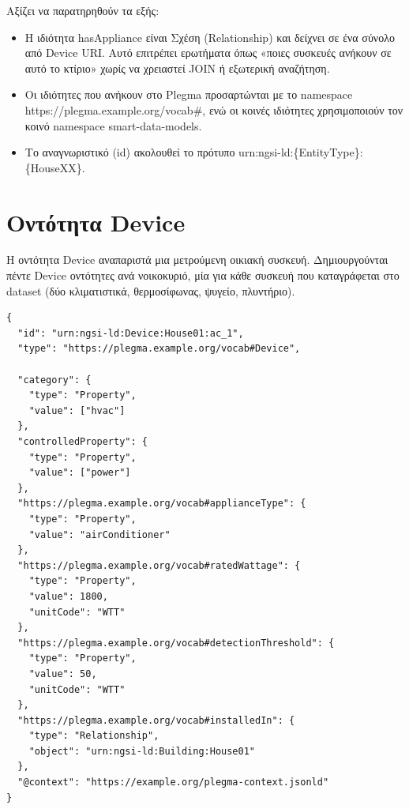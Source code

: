 Αξίζει να παρατηρηθούν τα εξής:
\begin{itemize}
    \item Η ιδιότητα \textlatin{hasAppliance} είναι Σχέση
    (\textlatin{Relationship}) και δείχνει σε ένα σύνολο από
    \textlatin{Device URI}. Αυτό επιτρέπει ερωτήματα όπως «ποιες συσκευές
    ανήκουν σε αυτό το κτίριο» χωρίς να χρειαστεί \textlatin{JOIN} ή
    εξωτερική αναζήτηση.
    \item Οι ιδιότητες που ανήκουν στο \textlatin{Plegma} προσαρτώνται με
    το \textlatin{namespace} \textlatin{https://plegma.example.org/vocab\#},
    ενώ οι κοινές ιδιότητες χρησιμοποιούν τον
    κοινό \textlatin{namespace} \textlatin{smart-data-models}.
    \item Το αναγνωριστικό (\textlatin{id}) ακολουθεί το πρότυπο
    \textlatin{urn:ngsi-ld:\{EntityType\}:\{HouseXX\}}.
\end{itemize}

\section{Οντότητα \textlatin{Device}}
\label{sec:entity-device}

Η οντότητα \textlatin{Device} αναπαριστά μια μετρούμενη οικιακή συσκευή.
Δημιουργούνται πέντε \textlatin{Device} οντότητες ανά νοικοκυριό, μία για κάθε
συσκευή που καταγράφεται στο \textlatin{dataset} (δύο κλιματιστικά,
θερμοσίφωνας, ψυγείο, πλυντήριο).

\vspace{0.5cm}
\begin{lstlisting}[language={}, caption={Device entity for air conditioner ac\_1.}]
{
  "id": "urn:ngsi-ld:Device:House01:ac_1",
  "type": "https://plegma.example.org/vocab#Device",

  "category": {
    "type": "Property",
    "value": ["hvac"]
  },
  "controlledProperty": {
    "type": "Property",
    "value": ["power"]
  },
  "https://plegma.example.org/vocab#applianceType": {
    "type": "Property",
    "value": "airConditioner"
  },
  "https://plegma.example.org/vocab#ratedWattage": {
    "type": "Property",
    "value": 1800,
    "unitCode": "WTT"
  },
  "https://plegma.example.org/vocab#detectionThreshold": {
    "type": "Property",
    "value": 50,
    "unitCode": "WTT"
  },
  "https://plegma.example.org/vocab#installedIn": {
    "type": "Relationship",
    "object": "urn:ngsi-ld:Building:House01"
  },
  "@context": "https://example.org/plegma-context.jsonld"
}
\end{lstlisting}

